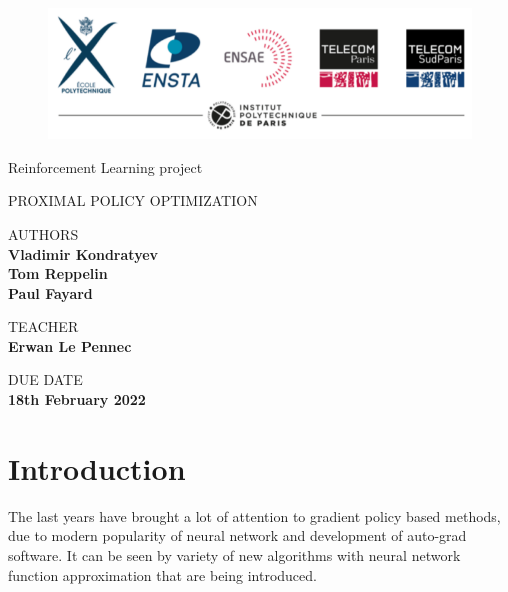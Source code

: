\documentclass{article}
\begin{document}
\thispagestyle{empty}

	\begin{figure}[ht]
	\centering
			\includegraphics[width=15cm]{img/ipp.png}
			\label{EscudoUNAM}
	\end{figure}
	

	
	\begin{center}
	\vspace{2cm}
	\LARGE
	Reinforcement Learning project
	
	\vspace{1.5cm}
	\LARGE
	PROXIMAL POLICY OPTIMIZATION
	

	\vspace{2cm}
	\normalsize	
	AUTHORS \\
	\vspace{.3cm}
	\large
	\textbf{Vladimir Kondratyev \\ Tom Reppelin \\ Paul Fayard}
	
	\vspace{1.3cm}
	\normalsize	
	TEACHER \\
	\vspace{.3cm}
	\large
	\textbf{Erwan Le Pennec}
	

	\vspace{1.3cm}
	\normalsize	
	DUE DATE \\
	\vspace{.3cm}
	\large
	\textbf{18th February 2022}
	
	
	\end{center}
	

	
	\newpage


\tableofcontents

\newpage 

\section{Introduction}
The last years have brought a lot of attention to gradient policy based methods, due to modern popularity of neural network and development of auto-grad software. It can be seen by variety of new algorithms with neural network function approximation that are being introduced.
\end{document}
